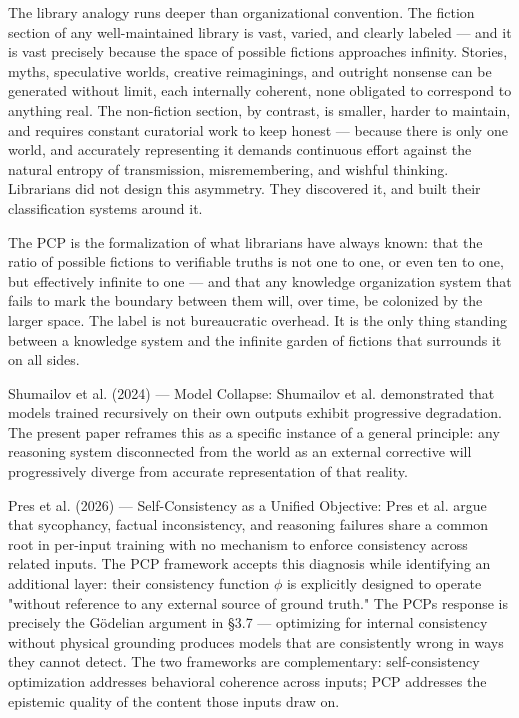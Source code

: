 \documentclass[
]{article}
\begin{document}
The library analogy runs deeper than organizational convention. The
fiction section of any well-maintained library is vast, varied, and
clearly labeled --- and it is vast precisely because the space of
possible fictions approaches infinity. Stories, myths, speculative
worlds, creative reimaginings, and outright nonsense can be generated
without limit, each internally coherent, none obligated to correspond to
anything real. The non-fiction section, by contrast, is smaller, harder
to maintain, and requires constant curatorial work to keep honest ---
because there is only one world, and accurately representing it demands
continuous effort against the natural entropy of transmission,
misremembering, and wishful thinking. Librarians did not design this
asymmetry. They discovered it, and built their classification systems
around it.

The PCP is the formalization of what librarians have always known: that
the ratio of possible fictions to verifiable truths is not one to one,
or even ten to one, but effectively infinite to one --- and that any
knowledge organization system that fails to mark the boundary between
them will, over time, be colonized by the larger space. The label is not
bureaucratic overhead. It is the only thing standing between a knowledge
system and the infinite garden of fictions that surrounds it on all
sides.

Shumailov et al. (2024) --- Model Collapse: Shumailov et al.
demonstrated that models trained recursively on their own outputs
exhibit progressive degradation. The present paper reframes this as a
specific instance of a general principle: any reasoning system
disconnected from the world as an external corrective will progressively
diverge from accurate representation of that reality.

Pres et al. (2026) --- Self-Consistency as a Unified Objective: Pres et
al. argue that sycophancy, factual inconsistency, and reasoning failures
share a common root in per-input training with no mechanism to enforce
consistency across related inputs. The PCP framework accepts this
diagnosis while identifying an additional layer: their consistency
function $\phi$ is explicitly designed to operate "without reference to any
external source of ground truth." The PCP\textquotesingle s response is
precisely the Gödelian argument in §3.7 --- optimizing for internal
consistency without physical grounding produces models that are
consistently wrong in ways they cannot detect. The two frameworks are
complementary: self-consistency optimization addresses behavioral
coherence across inputs; PCP addresses the epistemic quality of the
content those inputs draw on.
\end{document}
